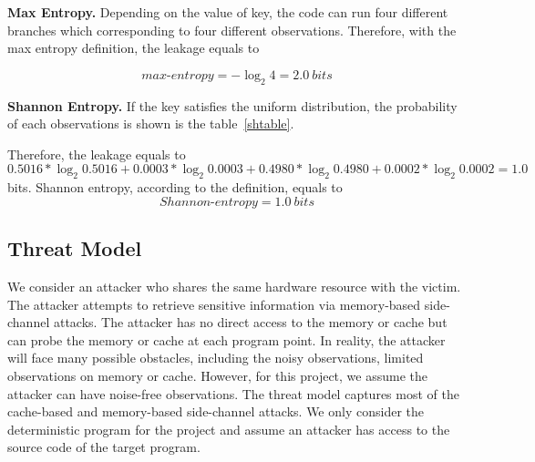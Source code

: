\textbf{Max Entropy.} 
Depending on the value of key, the code can run four different branches which corresponding to 
four different observations. Therefore, with the max entropy definition, the leakage equals to 

\begin{displaymath}
    \mathit{max\text{-}entropy} = -\log_2{4} = 2.0\ \mathit{bits}
\end{displaymath}

\vspace{3pt}
\textbf{Shannon Entropy.}
If the key satisfies the uniform distribution, the probability of each observations
is shown is the table~\ref{shtable}.  

Therefore, the leakage equals to 
$0.5016*\log_{2}0.5016 + 0.0003*\log_{2}0.0003 + 0.4980*\log_{2}0.4980 + 0.0002*\log_{2}0.0002= 1.0$ bits.
Shannon entropy, according to the definition, equals to 
\begin{displaymath}
    \mathit{Shannon\text{-}entropy} = 1.0\ \mathit{bits}
\end{displaymath}

\subsection{Threat Model}
We consider an attacker who shares the same hardware resource with the victim. 
The attacker attempts to retrieve sensitive information via memory-based 
side-channel attacks. 
The attacker has no direct access to the memory or cache but can probe the 
memory or cache at each program point. In reality, the attacker will face 
many possible obstacles,
including the noisy observations, limited observations on memory or cache.
However, for this project, we assume the attacker can have noise-free observations. 
The threat model captures most of the cache-based and memory-based side-channel attacks.
We only consider the deterministic program for the project and assume an attacker has
access to the source code of the target program.
